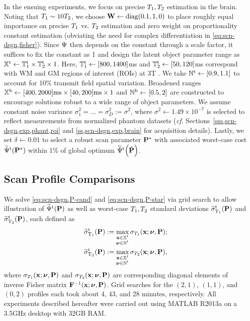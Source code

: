 In the ensuing experiments, 
we focus on precise $T_1,T_2$ estimation in the brain.
Noting that $T_1\sim10T_2$, 
we choose $\mathbf{W} \gets \mathrm{diag}\paren{0.1, 1, 0}$ 
to place roughly equal importance 
on precise $T_1$ vs. $T_2$ estimation
and zero weight
on proportionality constant estimation
(obviating the need
for complex differentiation
in \eqref{eq:scn-dsgn,fisher}).
Since $\Psi$ then depends 
on the constant through a scale factor,
it suffices to fix the constant as 1
and design the latent object parameter range
as $\mathbb{X}^\mathrm{t} \gets \mathbb{T}_1^{\mathrm{t}} \times \mathbb{T}_2^{\mathrm{t}} \times 1$.
Here, 
$\mathbb{T}_1^{\mathrm{t}} \gets [800, 1400]$ms
and $\mathbb{T}_2^{\mathrm{t}} \gets [50, 120]$ms
correspond with WM and GM regions of interest (ROIs)
at 3T \cite{wansapura:99:nrt, stanisz:05:ttr}.
We take $\setNt \gets \brac{0.9, 1.1}$ 
to account for 10\% transmit field spatial variation. 
Broadened ranges 
$\mathbb{X}^\mathrm{b} \gets [400, 2000]\text{ms} \times [40, 200]\text{ms} \times 1$ 
and $\mathbb{N}^\mathrm{b} \gets [0.5, 2]$ are constructed 
to encourage solutions robust 
to a wide range of object parameters. 
We assume constant noise variance 
$\sigma_1^2 = \dots = \sigma_D^2 := \sigma^2$, 
where $\sigma^2 \gets 1.49 \times 10^{-7}$ is selected 
to reflect measurements from normalized phantom datasets 
(\emph{cf.} Sections~\ref{sss,scn-dsgn,exp,phant,roi} 
and \ref{ss,scn-dsgn,exp,brain} 
for acquisition details).
Lastly, we set $\delta \gets 0.01$ 
to select a robust scan parameter $\mathbf{P}^*$ 
with associated worst-case cost $\costawt{\bmPs}$ 
within 1\% of global optimum $\costawt{\bmPc}$.

\subsection{Scan Profile Comparisons}
\label{ss,scn-dsgn,opt,compare} 

We solve \eqref{eq:scn-dsgn,P-cand} and \eqref{eq:scn-dsgn,P-star} 
via grid search 
to allow illustration 
of $\widetilde{\Psi}^{\mathrm{t}}(\mathbf{P})$ 
as well as worst-case $T_1,T_2$ standard deviations 
$\widetilde{\sigma}_{\mathrm{T}_1}^\mathrm{t}(\mathbf{P})$ and $\widetilde{\sigma}_{\mathrm{T}_2}^\mathrm{t}(\mathbf{P})$, 
each defined as
\begin{align}
	\widetilde{\sigma}_{\mathrm{T}_1}^\mathrm{t}(\mathbf{P}) &:= 
		\max_{\substack{\mathbf{x} \in \mathbb{X}^\mathrm{t} \\ \boldsymbol{\nu} \in \mathbb{N}^\mathrm{t}}} 
		\sigma_{T_1}(\mathbf{x}; \boldsymbol{\nu}, \mathbf{P}); 
		\label{eq:sigwot} \\
	\widetilde{\sigma}_{\mathrm{T}_2}^\mathrm{t}(\mathbf{P}) &:= 
		\max_{\substack{\mathbf{x} \in \mathbb{X}^\mathrm{t} \\ \boldsymbol{\nu} \in \mathbb{N}^\mathrm{t}}} 
		\sigma_{T_2}(\mathbf{x}; \boldsymbol{\nu}, \mathbf{P}), 
		\label{eq:sigwtt} 
\end{align}
where $\sigma_{T_1}(\mathbf{x}; \boldsymbol{\nu}, \mathbf{P})$ 
and $\sigma_{T_2}(\mathbf{x}; \boldsymbol{\nu}, \mathbf{P})$ 
are corresponding diagonal elements 
of inverse Fisher matrix $\mathbf{F}^{-1}(\mathbf{x}; \boldsymbol{\nu}, \mathbf{P})$. 
Grid searches for the $(2,1)$, $(1,1)$, and $(0,2)$ profiles 
each took about 4, 43, and 28 minutes, respectively.
All experiments described hereafter were carried out 
using MATLAB\textsuperscript{\textregistered} R2013a 
on a 3.5GHz desktop with 32GB RAM. 

